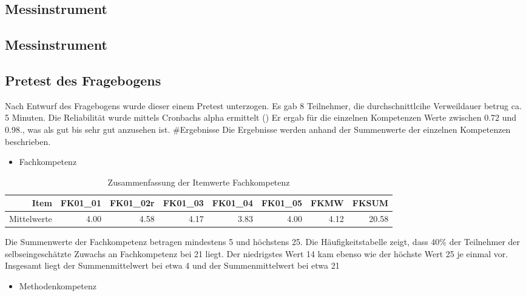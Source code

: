 \documentclass[12pt, bibliography=totoc]{scrartcl}
\begin{document}
\subsection{Messinstrument}\label{messinstrument}

\subsection{Messinstrument}\label{messinstrument-1}

\subsection{Pretest des Fragebogens}\label{pretest-des-fragebogens}

Nach Entwurf des Fragebogens wurde dieser einem Pretest unterzogen. Es
gab 8 Teilnehmer, die durchschnittlcihe Verweildauer betrug ca. 5
Minuten. Die Reliabilität wurde mittels Cronbachs alpha ermittelt
(\textcite{Wassa}) Er ergab für die einzelnen Kompetenzen Werte zwischen
0.72 und 0.98., was als gut bis sehr gut anzusehen ist. \#Ergebnisse Die
Ergebnisse werden anhand der Summenwerte der einzelnen Kompetenzen
beschrieben.

\begin{itemize}
\tightlist
\item
  Fachkompetenz
\end{itemize}

\begin{table}[H]
\centering
\caption{Zusammenfassung der Itemwerte Fachkompetenz}
\begin{tabular}{rrrrrrrr}
  \hline
 Item & FK01\_01 & FK01\_02r & FK01\_03 & FK01\_04 & FK01\_05 & FKMW & FKSUM \\
  \hline
Mittelwerte & 4.00 & 4.58 & 4.17 & 3.83 & 4.00 & 4.12 & 20.58 \\
   \hline
\end{tabular}
\end{table}

Die Summenwerte der Fachkompetenz betragen mindestens 5 und höchstens
25. Die Häufigkeitstabelle zeigt, dass 40\% der Teilnehmer der
selbseingeschätzte Zuwachs an Fachkompetenz bei 21 liegt. Der
niedrigstes Wert 14 kam ebenso wie der höchste Wert 25 je einmal vor.
Insgesamt liegt der Summenmittelwert bei etwa 4 und der Summenmittelwert
bei etwa 21

\begin{itemize}
\tightlist
\item
  Methodenkompetenz
\end{itemize}
\end{document}
